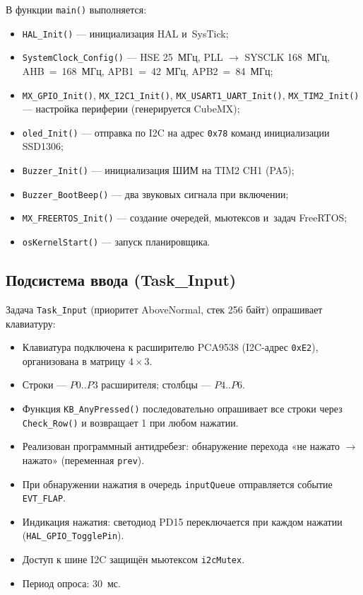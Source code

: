 \documentclass[a4paper,12pt]{article}
\begin{document}
В функции \texttt{main()} выполняется:
\begin{itemize}
    \item \texttt{HAL\_Init()} — инициализация HAL и~SysTick;
    \item \texttt{SystemClock\_Config()} — HSE 25~МГц, PLL $\to$ SYSCLK 168~МГц, AHB~=~168~МГц, APB1~=~42~МГц, APB2~=~84~МГц;
    \item \texttt{MX\_GPIO\_Init()}, \texttt{MX\_I2C1\_Init()}, \texttt{MX\_USART1\_UART\_Init()}, \texttt{MX\_TIM2\_Init()} — настройка периферии (генерируется CubeMX);
    \item \texttt{oled\_Init()} — отправка по I2C на адрес \texttt{0x78} команд инициализации SSD1306;
    \item \texttt{Buzzer\_Init()} — инициализация ШИМ на TIM2 CH1 (PA5);
    \item \texttt{Buzzer\_BootBeep()} — два звуковых сигнала при включении;
    \item \texttt{MX\_FREERTOS\_Init()} — создание очередей, мьютексов и~задач FreeRTOS;
    \item \texttt{osKernelStart()} — запуск планировщика.
\end{itemize}


\subsection{Подсистема ввода (Task\_Input)}


Задача \texttt{Task\_Input} (приоритет AboveNormal, стек 256 байт) опрашивает клавиатуру:
\begin{itemize}
    \item Клавиатура подключена к расширителю PCA9538 (I2C-адрес \texttt{0xE2}), организована в матрицу $4\times3$.
    \item Строки — $P0..P3$ расширителя; столбцы — $P4..P6$.
    \item Функция \texttt{KB\_AnyPressed()} последовательно опрашивает все строки через \texttt{Check\_Row()} и возвращает 1 при любом нажатии.
    \item Реализован программный антидребезг: обнаружение перехода «не нажато $\to$ нажато» (переменная \texttt{prev}).
    \item При обнаружении нажатия в очередь \texttt{inputQueue} отправляется событие \texttt{EVT\_FLAP}.
    \item Индикация нажатия: светодиод PD15 переключается при каждом нажатии (\texttt{HAL\_GPIO\_TogglePin}).
    \item Доступ к шине I2C защищён мьютексом \texttt{i2cMutex}.
    \item Период опроса: 30~мс.
\end{itemize}
\end{document}
